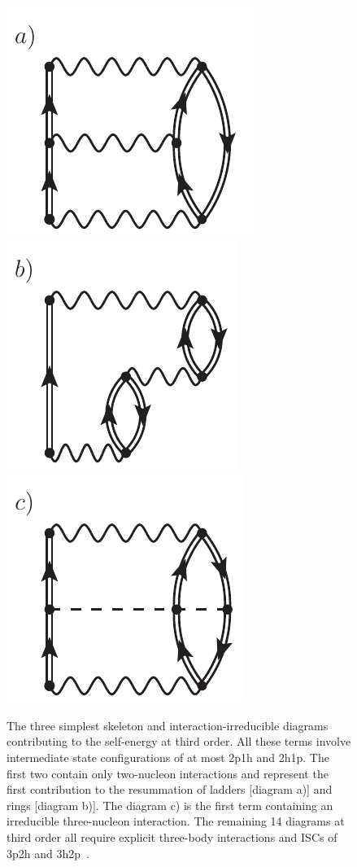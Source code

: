 \begin{figure}[t]
\begin{center}
\includegraphics[height=0.18\textheight]{Chapter11-figures/fig11_4_a.pdf}   \hspace{0.03\textwidth} 
\includegraphics[height=0.18\textheight]{Chapter11-figures/fig11_4_b.pdf}   \hspace{0.03\textwidth} 
\includegraphics[height=0.18\textheight]{Chapter11-figures/fig11_4_c.pdf}  
\caption{The three simplest skeleton and interaction-irreducible diagrams contributing to the self-energy at third order.  All these terms involve intermediate state configurations of at most 2p1h and 2h1p. The first two contain only two-nucleon interactions and represent the first contribution to the  resummation of ladders [diagram a)] and rings [diagram b)]. The diagram c) is the first term containing an irreducible three-nucleon interaction. The remaining 14 diagrams at third order all require explicit three-body interactions and ISCs of 3p2h and 3h2p~\cite{ch11_Carbone2013Nov,ch11_Raimondi_inprep}.  }
\label{fig:3rdOrd}
\end{center}
\end{figure}

